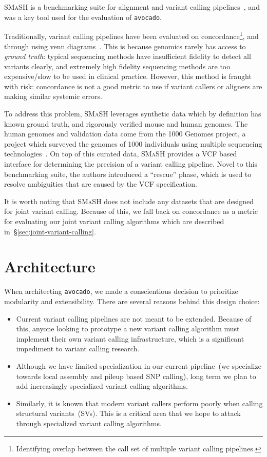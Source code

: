 \documentclass{acm_proc_article-sp}
\begin{document}

\textsc{SMaSH} is a benchmarking suite for alignment and variant calling pipelines~\cite{talwalkar13}, and was a key tool used for the
evaluation of \texttt{avocado}.

Traditionally, variant calling pipelines have been evaluated on concordance\footnote{Identifying overlap between the call set of multiple
variant calling pipelines.}, and through using venn diagrams~\cite{tao13}. This is because genomics rarely has access to \emph{ground
truth}: typical sequencing methods have insufficient fidelity to detect all variants clearly, and extremely high fidelity sequencing methods
are too expensive/slow to be used in clinical practice. However, this method is fraught with risk: concordance is not a good metric to use if
variant callers or aligners are making similar systemic errors.

To address this problem, \textsc{SMaSH} leverages synthetic data which by definition has known ground truth, and rigorously verified
mouse and human genomes. The human genomes and validation data come from the 1000 Genomes project, a project which surveyed
the genomes of 1000 individuals using multiple sequencing technologies~\cite{siva08}. On top of this curated data, \textsc{SMaSH}
provides a VCF based interface for determining the precision of a variant calling pipeline. Novel to this benchmarking suite, the authors
introduced a ``rescue'' phase, which is used to resolve ambiguities that are caused by the VCF specification.

It is worth noting that \textsc{SMaSH} does not include any datasets that are designed for joint variant calling. Because of this, we fall back
on concordance as a metric for evaluating our joint variant calling algorithms which are described in~\S\ref{sec:joint-variant-calling}.

\section{Architecture}
\label{sec:architecture}


When architecting \texttt{avocado}, we made a conscientious decision to prioritize modularity and extensibility. There are several reasons
behind this design choice:

\begin{itemize}
\item Current variant calling pipelines are not meant to be extended. Because of this, anyone looking to prototype a new variant calling
algorithm must implement their own variant calling infrastructure, which is a significant impediment to variant calling research.
\item Although we have limited specialization in our current pipeline~(we specialize towards local assembly and pileup based SNP
calling), long term we plan to add increasingly specialized variant calling algorithms.
\item Similarly, it is known that modern variant callers perform poorly when calling structural variants~(SVs). This is a critical area that we
hope to attack through specialized variant calling algorithms.
\end{itemize}
\end{document}
